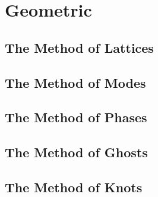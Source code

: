 \documentclass{antiquebook}
\begin{document}
\chapter{Geometric}

    \section{The Method of Lattices}
    
    \section{The Method of Modes}
    
    \section{The Method of Phases}
    
    \section{The Method of Ghosts}
    
    \section{The Method of Knots}
\end{document}
